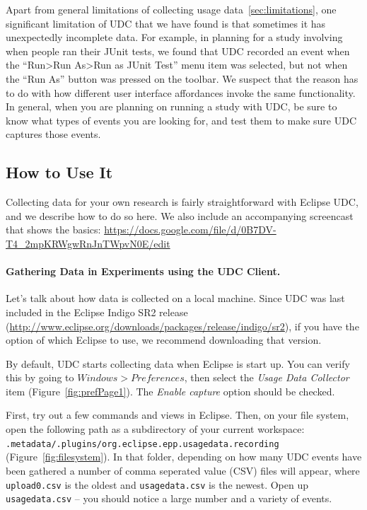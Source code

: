 Apart from general limitations of collecting usage data~\ref{sec:limitations},
one significant limitation of UDC that we have found is that sometimes it has 
unexpectedly incomplete data.
For example, in planning for a study involving when people ran their JUnit tests,
we found that UDC recorded an event when the ``Run>Run As>Run as JUnit Test'' menu item was selected,
but not when the ``Run As'' button was pressed on the toolbar.
We suspect that the reason has to do with how different user interface affordances 
invoke the same functionality.
In general, when you are planning on running a study with UDC, be sure to know what 
types of events you are looking for, and test them to make sure UDC captures those events.

\subsection{How to Use It}

Collecting data for your own research is fairly straightforward with Eclipse UDC,
and we describe how to do so here.
We also include an accompanying screencast that shows the basics: 
\url{https://docs.google.com/file/d/0B7DV-T4_2mpKRWgwRnJnTWpvN0E/edit}

\paragraph{Gathering Data in Experiments using the UDC Client.}

Let's talk about how data is collected on a local machine.
Since UDC was last included in the Eclipse Indigo SR2 release 
(\url{http://www.eclipse.org/downloads/packages/release/indigo/sr2}), 
if you have the option of which Eclipse to use, we recommend downloading
that version.

By default, UDC starts collecting data when Eclipse is start up. 
You can verify this by going to $Windows > Preferences$, then 
select the \textit{Usage Data Collector} item (Figure~\ref{fig:prefPage1}).
The \textit{Enable capture} option should be checked.

First, try out a few commands and views in Eclipse.
Then, on your file system, open the following path as a subdirectory
of your current workspace: \texttt{.metadata/.plugins/org.eclipse.epp.usagedata.recording}
(Figure~\ref{fig:filesystem}).
In that folder, depending on how many UDC events have been gathered 
a number of comma seperated value (CSV) files will appear, where \texttt{upload0.csv} is the oldest
and \texttt{usagedata.csv} is the newest.
Open up \texttt{usagedata.csv} -- you should notice a large number and a variety of events.

